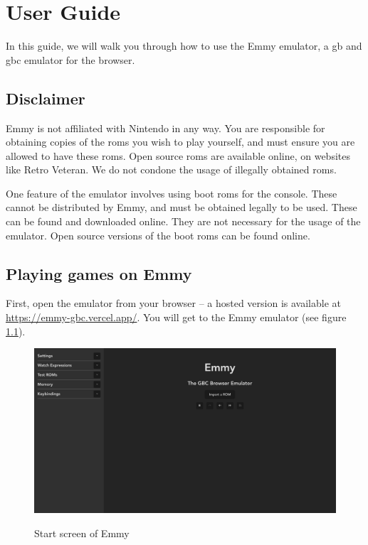\chapter{User Guide}

In this guide, we will walk you through how to use the Emmy emulator, a \glsdesc{gb} and \glsdesc{gbc} emulator for the browser.

\section{Disclaimer}

Emmy is not affiliated with Nintendo in any way. You are responsible for obtaining copies of the \glspl{rom} you wish to play yourself, and must ensure you are allowed to have these \glspl{rom}. Open source \glspl{rom} are available online, on websites like Retro Veteran. We do not condone the usage of illegally obtained \glspl{rom}.

One feature of the emulator involves using boot \glspl{rom} for the console. These cannot be distributed by Emmy, and must be obtained legally to be used. These can be found and downloaded online. They are not necessary for the usage of the emulator. Open source versions of the boot \glspl{rom} can be found online.


\section{Playing games on Emmy}

First, open the emulator from your browser -- a hosted version is available at \url{https://emmy-gbc.vercel.app/}. You will get to the Emmy emulator (see figure \ref{fig:emmy-startup-screen}).

\begin{figure}[h]
    \centering
    \includegraphics[width=12cm]{images/emmy-startup-screen}\\
    \caption{Start screen of Emmy}
    \label{fig:emmy-startup-screen}
\end{figure}

